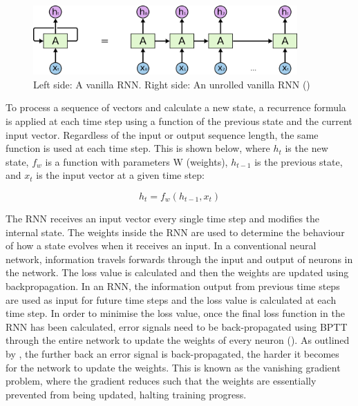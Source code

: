 \begin{figure}[ht!]
\centering
\includegraphics[width=0.9\textwidth]{media/literature/machine_learning/ml_rnn_unrolled.png}
\caption[Diagram of an unrolled Recurrent Neural Network]{Left side: A vanilla \acrlong{RNN}. Right side: An unrolled vanilla \acrlong{RNN} (\cite{colah_lstm_2019})}
\label{fig:rnn_unrolled}
\end{figure}

To process a sequence of vectors and calculate a new state, a recurrence formula is applied at each time step using a function of the previous state and the current input vector. Regardless of the input or output sequence length, the same function is used at each time step. This is shown below, where $h_t$ is the new state, $f_w$ is a function with parameters W (weights), $h_{t-1}$ is the previous state, and $x_t$ is the input vector at a given time step: 

\begin{equation}
    h_{t} = f_{w} \left ( h_{t-1},x_{t} \right )
\end{equation}

The \acrshort{RNN} receives an input vector every single time step and modifies the internal state. The weights inside the \acrshort{RNN} are used to determine the behaviour of how a state evolves when it receives an input. 
In a conventional neural network, information travels forwards through the input and output of neurons in the network. The loss value is calculated and then the weights are updated using backpropagation.
In an \acrshort{RNN}, the information output from previous time steps are used as input for future time steps and the loss value is calculated at each time step. In order to minimise the loss value, once the final loss function in the \acrshort{RNN} has been calculated, error signals need to be back-propagated using \acrfull{BPTT} through the entire network to update the weights of every neuron (\cite{salehinejad_recent_rnn_2018}).
As outlined by \cite{bengio_learning_1994}, the further back an error signal is back-propagated, the harder it becomes for the network to update the weights. This is known as the vanishing gradient problem, where the gradient reduces such that the weights are essentially prevented from being updated, halting training progress.

